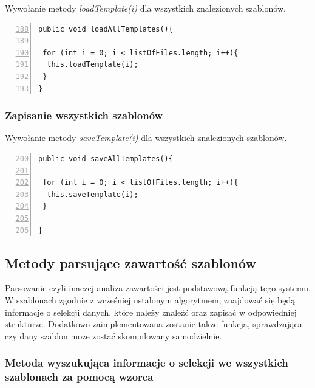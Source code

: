 Wywołanie metody \emph{loadTemplate(i)} dla wszystkich znalezionych szablonów.

 \begin{lstlisting}[numbers=left,firstnumber=188]
public void loadAllTemplates(){
      
 for (int i = 0; i < listOfFiles.length; i++){
  this.loadTemplate(i);
 }
}
\end{lstlisting}

\subsubsection*{Zapisanie wszystkich szablonów}

Wywołanie metody \emph{saveTemplate(i)} dla wszystkich znalezionych szablonów.

 \begin{lstlisting}[numbers=left,firstnumber=200]
public void saveAllTemplates(){
      
 for (int i = 0; i < listOfFiles.length; i++){
  this.saveTemplate(i);
 }
       
}
\end{lstlisting}

\subsection{Metody parsujące zawartość szablonów}

Parsowanie czyli inaczej analiza zawartości jest podstawową funkcją tego systemu. W szablonach zgodnie z wcześniej ustalonym algorytmem, znajdować się będą informacje o selekcji danych, które należy znaleźć oraz zapisać w odpowiedniej strukturze. Dodatkowo zaimplementowana zostanie także funkcja, sprawdzająca czy dany szablon może zostać skompilowany samodzielnie. 

\subsubsection*{Metoda wyszukująca informacje o selekcji we wszystkich szablonach za pomocą wzorca}

